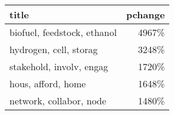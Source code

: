 \begin{tabular}{p{1.2cm}r}
\toprule
                       title &  pchange \\
\midrule
 biofuel, feedstock, ethanol &    4967\% \\
      hydrogen, cell, storag &    3248\% \\
    stakehold, involv, engag &    1720\% \\
          hous, afford, home &    1648\% \\
     network, collabor, node &    1480\% \\
\bottomrule
\end{tabular}
